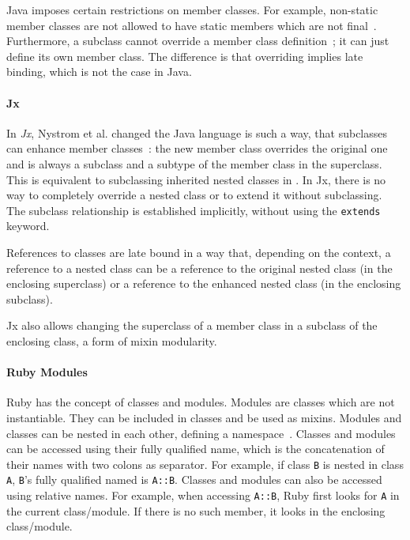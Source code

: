 Java imposes certain restrictions on member classes. For example, non-static member classes are not allowed to have static members which are not final~\cite{javalang1}. Furthermore, a subclass cannot override a member class definition~\cite{igarashi2002inner}; it can just define its own member class. The difference is that overriding implies late binding, which is not the case in Java. 

\paragraph{Jx}
In \emph{Jx}, Nystrom et al. changed the Java language is such a way, that subclasses can enhance member classes~\cite{Nystrom:2004:SEV:1028976.1028986}: the new member class overrides the original one and is always a subclass and a subtype of the member class in the superclass. This is equivalent to subclassing inherited nested classes in \msname. In Jx, there is no way to completely override a nested class or to extend it without subclassing. The subclass relationship is established implicitly, without using the \texttt{extends} keyword.

References to classes are late bound in a way that, depending on the context, a reference to a nested class can be a reference to the original nested class (in the enclosing superclass) or a reference to the enhanced nested class (in the enclosing subclass).

Jx also allows changing the superclass of a member class in a subclass of the enclosing class, a form of mixin modularity.

\paragraph{Ruby Modules}
Ruby has the concept of classes and modules. Modules are classes which are not instantiable. They can be included in classes and be used as mixins. Modules and classes can be nested in each other, defining a namespace~\cite{Bergel:jucs_11_10:analyzing_module_diversity}. Classes and modules can be accessed using their fully qualified name, which is the concatenation of their names with two colons as separator. For example, if class \texttt{B} is nested in class \texttt{A}, \texttt{B}'s fully qualified named is \texttt{A::B}. Classes and modules can also be accessed using relative names. For example, when accessing \texttt{A::B}, Ruby first looks for \texttt{A} in the current class/module. If there is no such member, it looks in the enclosing class/module.


